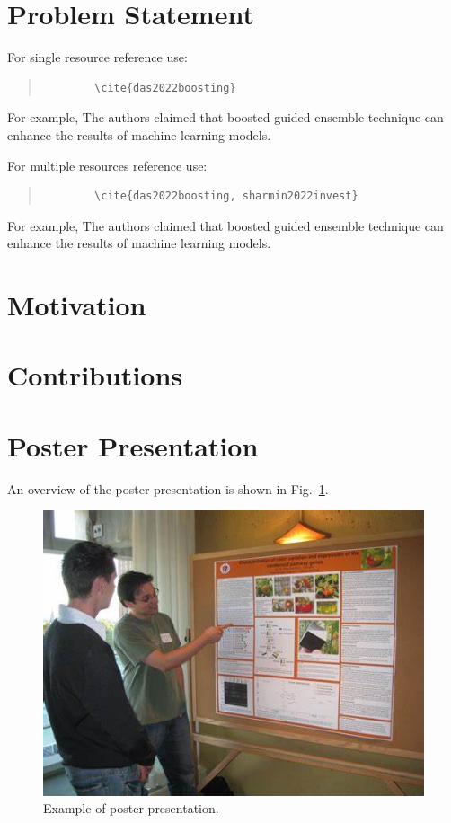 \section{Problem Statement}
\lipsum[7-8] 

For single resource reference use: 
\begin{quote}
    \begin{verbatim}
        \cite{das2022boosting}
    \end{verbatim}
\end{quote}

For example, The authors \cite{das2022boosting} claimed that boosted guided ensemble technique can enhance the results of machine learning models.

For multiple resources reference use: 
\begin{quote}
    \begin{verbatim}
        \cite{das2022boosting, sharmin2022invest}
    \end{verbatim}
\end{quote}

For example, The authors \cite{das2022boosting, sharmin2022investigation, uddin2022multi} claimed that boosted guided ensemble technique can enhance the results of machine learning models. 

\section{Motivation}
\lipsum[4-5]

\section{Contributions}
\lipsum[4-5]

\section{Poster Presentation}
\lipsum[1-1]
An overview of the poster presentation is shown in Fig.~\ref{fig:poster_presentation}.

\begin{figure}[H]
\centering
  \includegraphics[width=\linewidth]{figures/poster.jpg}
  \caption{Example of poster presentation.}
  \label{fig:poster_presentation}
\end{figure}

